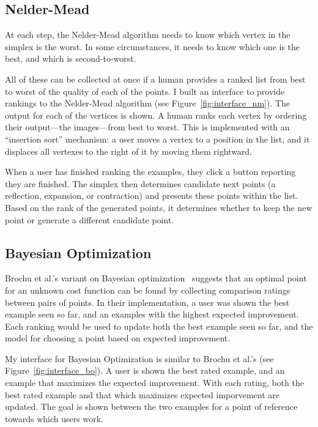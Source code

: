 \subsection{Nelder-Mead}

At each step, the Nelder-Mead algorithm needs to know which vertex in the simplex is the worst.
In some circumstances, it needs to know which one is the best, and which is second-to-worst.

All of these can be collected at once if a human provides a ranked list from best to worst of the quality of each of the points.
I built an interface to provide rankings to the Nelder-Mead algorithm (see Figure~\ref{fig:interface_nm}).
The output for each of the vertices is shown.
A human ranks each vertex by ordering their output---the images---from best to worst.
This is implemented with an ``insertion sort'' mechanism:
a user moves a vertex to a position in the list, and it displaces all vertexes to the right of it by moving them rightward.

When a user has finished ranking the examples, they click a button reporting they are finished.
The simplex then determines candidate next points (a reflection, expansion, or contraction) and presents these points within the list.
Based on the rank of the generated points, it determines whether to keep the new point or generate a different candidate point.

\subsection{Bayesian Optimization}

Brochu et al.'s variant on Bayesian optimization~\cite{brochu_tutorial_2010} suggests that an optimal point for an unknown cost function can be found by collecting comparison ratings between pairs of points.
In their implementation, a user was shown the best example seen so far, and an examples with the highest expected improvement.
Each ranking would be used to update both the best example seen so far, and the model for choosing a point based on expected improvement.

My interface for Bayesian Optimization is similar to Brochu et al.'s (see Figure~\ref{fig:interface_bo}).
A user is shown the best rated example, and an example that maximizes the expected improvement.
With each rating, both the best rated example and that which maximizes expected imporvement are updated.
The goal is shown between the two examples for a point of reference towards which users work.
